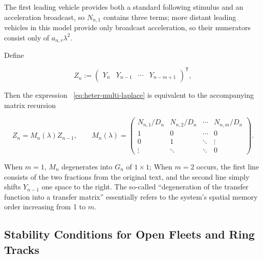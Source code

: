 \documentclass[11pt,a4paper,openany]{book}
\numberwithin{equation}{chapter}
\numberwithin{figure}{chapter}
\numberwithin{table}{chapter}
\begin{document}
The first leading vehicle provides both a standard following stimulus and an acceleration broadcast, so $N_{n,1}$ contains three terms; more distant leading vehicles in this model provide only broadcast acceleration, so their numerators consist only of $a_{n,r}\lambda^2$.




Define

\begin{equation}
Z_n:=\begin{pmatrix}Y_n&Y_{n-1}&\cdots&Y_{n-m+1}\end{pmatrix}^{\!\mathsf T},
\end{equation}







Then the expression ~\eqref{eq:heter-multi-laplace} is equivalent to the accompanying matrix recursion

\begin{equation}
Z_n=M_n(\lambda)Z_{n-1},
\qquad
M_n(\lambda)=
\begin{pmatrix}
N_{n,1}/D_n&N_{n,2}/D_n&\cdots&N_{n,m}/D_n\\
1&0&\cdots&0\\
0&1&\ddots&\vdots\\
\vdots&\ddots&\ddots&0
\end{pmatrix}.
\label{eq:heter-multi-matrix}
\end{equation}







When $m=1$, $M_n$ degenerates into $G_n$ of $1\times1$; When $m=2$ occurs, the first line consists of the two fractions from the original text, and the second line simply shifts $Y_{n-1}$ one space to the right. The so-called “degeneration of the transfer function into a transfer matrix” essentially refers to the system’s spatial memory order increasing from 1 to $m$.





\subsection{Stability Conditions for Open Fleets and Ring Tracks}
\end{document}
